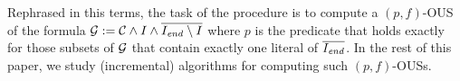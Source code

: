 Rephrased in this terms, the task of the procedure \onestep is to compute a $(p,f)$-OUS of the formula $\mathcal{G}  := \mathcal{C} \land I\land \overline{I_\mathit{end} \setminus I}$ where $p$ is the predicate that holds exactly for those subsets of $\mathcal{G} $ that contain exactly one literal of $\overline{I_\mathit{end} }$. 
In the rest of this paper, we study (incremental) algorithms for computing such $(p,f)$-OUSs. 




